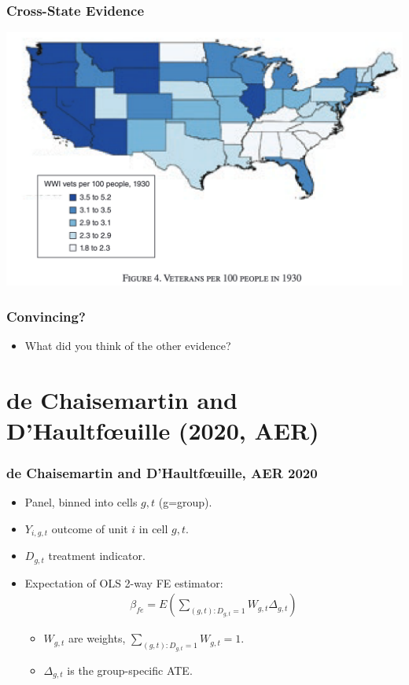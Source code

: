\documentclass[english,xcolor=svgnames]{beamer}
\begin{document}
\begin{frame}
	\frametitle[alignment=center]{Cross-State Evidence}
	\begin{center}
		\includegraphics[scale=0.45]{figures/HFIG5.png}
	\end{center}
\end{frame}

\begin{frame}
	\frametitle[alignment=center]{Convincing?}
	\begin{itemize}
		\item What did you think of the other evidence?
	\end{itemize}
\end{frame}


\section{de Chaisemartin and D'Haultf{\oe}uille (2020, AER)}

\begin{frame}
\frametitle[alignment=center]{de Chaisemartin and D'Haultf{\oe}uille, AER 2020}
\begin{itemize}
	\item Panel, binned into cells $g,t$ (g=group).
	\item $Y_{i,g,t}$ outcome of unit $i$ in cell $g,t$.
	\item $D_{g,t}$ treatment indicator.
	\item Expectation of OLS 2-way FE estimator:
	\begin{align*}
		\beta_{fe} = E \left(\sum_{(g,t):D_{g,t}=1} W_{g,t}\Delta_{g,t}\right)
	\end{align*}
	\begin{itemize}
		\item $W_{g,t}$ are weights, $\sum_{(g,t):D_{g,t}=1} W_{g,t}=1$.
		\item $\Delta_{g,t}$ is the group-specific ATE.
	\end{itemize}
\end{itemize}
\end{frame}
\end{document}
